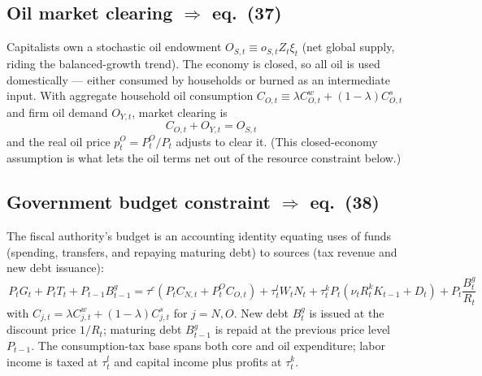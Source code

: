 \subsection{Oil market clearing \texorpdfstring{$\Rightarrow$}{=>} eq.\ (37)}
Capitalists own a stochastic oil endowment $O_{S,t}\equiv o_{S,t}Z_t\xi_t$ (net global supply, riding
the balanced-growth trend). The economy is closed, so all oil is used domestically --- either consumed
by households or burned as an intermediate input. With aggregate household oil consumption
$C_{O,t}\equiv\lambda C^w_{O,t}+(1-\lambda)C^s_{O,t}$ and firm oil demand $O_{Y,t}$, market clearing is
\begin{equation}\label{eq:37}
\boxed{\,C_{O,t}+O_{Y,t}=O_{S,t}\,}\tag{P-37}
\end{equation}
and the real oil price $p^O_t=P^O_t/P_t$ adjusts to clear it. (This closed-economy assumption is what
lets the oil terms net out of the resource constraint below.)

\subsection{Government budget constraint \texorpdfstring{$\Rightarrow$}{=>} eq.\ (38)}
The fiscal authority's budget is an accounting identity equating uses of funds (spending, transfers,
and repaying maturing debt) to sources (tax revenue and new debt issuance):
\begin{equation}\label{eq:38}
\boxed{\,P_tG_t+P_tT_t+P_{t-1}B^g_{t-1}
=\tau^c(P_tC_{N,t}+P^O_tC_{O,t})+\tau^l_tW_tN_t+\tau^k_tP_t(\nu_tR^k_tK_{t-1}+D_t)+P_t\frac{B^g_t}{R_t}\,}\tag{P-38}
\end{equation}
with $C_{j,t}=\lambda C^w_{j,t}+(1-\lambda)C^s_{j,t}$ for $j=N,O$. New debt $B^g_t$ is issued at the
discount price $1/R_t$; maturing debt $B^g_{t-1}$ is repaid at the previous price level $P_{t-1}$. The
consumption-tax base spans both core and oil expenditure; labor income is taxed at $\tau^l_t$ and
capital income plus profits at $\tau^k_t$.

